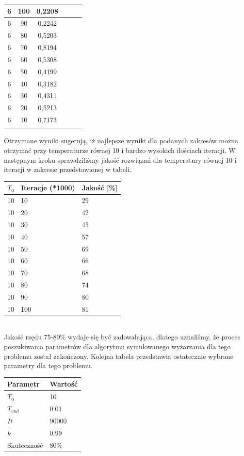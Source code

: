 \documentclass[twoside]{projektInzynierskiMS1}
\newcommand{\si}{ś}
\begin{document}
\begin{table}[htbp]
\begin{tabular}{|c|c|c||c|c|c|}
6 & 100 & 0,2208 \\ \hline 
6 & 90 & 0,2242 \\ \hline 
6 & 80 & 0,5203 \\ \hline 
6 & 70 & 0,8194 \\ \hline 
6 & 60 & 0,5308 \\ \hline 
6 & 50 & 0,4199\\ \hline 
6 & 40 & 0,3182 \\ \hline 
6 & 30 & 0,4311 \\ \hline 
6 & 20 & 0,5213 \\ \hline 
6 & 10 & 0,7173 \\ \Xhline{3\arrayrulewidth}


\end{tabular} 
\end{table}

Otrzymane wyniki sugerują, iż najlepsze wyniki dla podanych zakresów można otrzymać przy temperaturze równej 10 i bardzo wysokich ilo\si ciach iteracji. W następnym kroku sprawdzili\si my jako\si ć rozwiązań dla temperatury równej 10 i iteracji w zakresie przedstawionej w tabeli. \\

\begin{tabularx}{\textwidth}{|X|X|X|} 
                  \hline
 \textbf{ $T_0$} & \textbf{Iteracje (*1000)}& \textbf{ Jako\si ć [\%]}\\ \hline
10 & 10 & 29 \\ \hline
10 & 20 & 42 \\ \hline
10 & 30 & 45 \\ \hline 
10 & 40 & 57 \\ \hline 
10 & 50 & 69 \\ \hline 
10 & 60 & 66 \\ \hline
10 & 70 & 68 \\ \hline 
10 & 80 & 74 \\ \hline 
10 & 90 &  80\\ \hline 
10 & 100 & 81 \\ \hline 
\end{tabularx} \\

Jako\si ć rzędu 75-80\% wydaje się być zadowalająca, dlatego uznali\si my, że proces poszukiwania parametrów dla algorytmu symulowanego wyżarzania dla tego problemu został zakończony. Kolejna tabela przedstawia ostatecznie wybrane parametry dla tego problemu. \\

\begin{tabularx}{\textwidth}{ |X|X|} 
\hline
 \textbf{ Parametr} & \textbf{ Warto\si ć}\\ \hline
 $T_0$ & 10 \\ \hline 
 $T_{end}$ & 0.01 \\ \hline 
 $It$ & 90000 \\ \hline
 $k$& 0.99 \\ \hline 
 Skuteczno\si ć & 80\% \\ \hline 
\end{tabularx}
\end{document}
